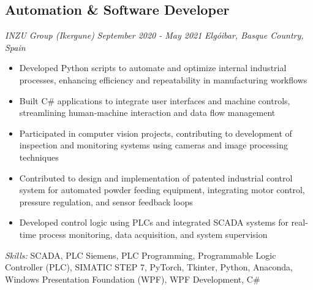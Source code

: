 \documentclass[11pt,a4paper]{article}
\begin{document}
\subsection{Automation \& Software Developer}
\textit{INZU Group (Ikergune)} \hfill \textit{September 2020 - May 2021}
\textit{Elgóibar, Basque Country, Spain}
\begin{itemize}
    \item Developed Python scripts to automate and optimize internal industrial processes, enhancing efficiency and repeatability in manufacturing workflows
    \item Built C\# applications to integrate user interfaces and machine controls, streamlining human-machine interaction and data flow management
    \item Participated in computer vision projects, contributing to development of inspection and monitoring systems using cameras and image processing techniques
    \item Contributed to design and implementation of patented industrial control system for automated powder feeding equipment, integrating motor control, pressure regulation, and sensor feedback loops
    \item Developed control logic using PLCs and integrated SCADA systems for real-time process monitoring, data acquisition, and system supervision
\end{itemize}
\textit{Skills:} SCADA, PLC Siemens, PLC Programming, Programmable Logic Controller (PLC), SIMATIC STEP 7, PyTorch, Tkinter, Python, Anaconda, Windows Presentation Foundation (WPF), WPF Development, C\#
\end{document}

